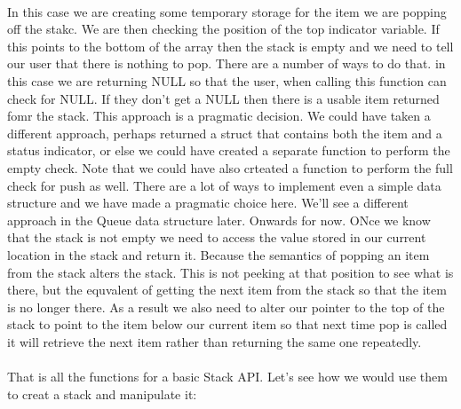 \documentclass[10pt, a4paper, twosize]{article}
\begin{document}
\paragraph{} In this case we are creating some temporary storage for the item we are popping off the stakc. We are then checking the position of the top indicator variable. If this points to the bottom of the array then the stack is empty and we need to tell our user that there is nothing to pop. There are a number of ways to do that. in this case we are returning NULL so that the user, when calling this function can check for NULL. If they don't get a NULL then there is a usable item returned fomr the stack. This approach is a pragmatic decision. We could have taken a different approach, perhaps returned a struct that contains both the item and a status indicator, or else we could have created a separate function to perform the empty check. Note that we could have also crteated a function to perform the full check for push as well. There are a lot of ways to implement even a simple data structure and we have made a pragmatic choice here. We'll see a different approach in the Queue data structure later. Onwards for now. ONce we know that the stack is not empty we need to access the value stored in our current location in the stack and return it. Because the semantics of popping an item from the stack alters the stack. This is not peeking at that position to see what is there, but the equvalent of getting the next item from the stack so that the item is no longer there. As a result we also need to alter our pointer to the top of the stack to point to the item below our current item so that next time pop is called it will retrieve the next item rather than returning the same one repeatedly.

\paragraph{} That is all the functions for a basic Stack API. Let's see how we would use them to creat a stack and manipulate it:
\end{document}
